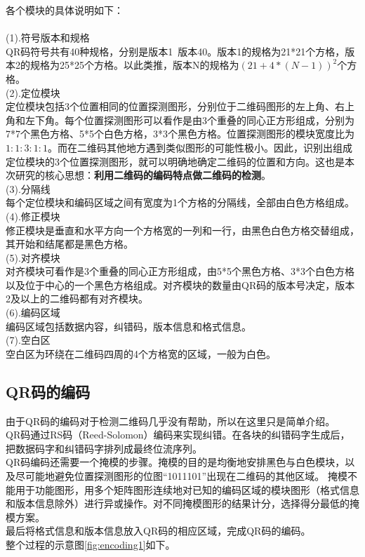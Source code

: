 各个模块的具体说明如下：\\ \\
(1).符号版本和规格\\
QR码符号共有40种规格，分别是版本1~版本40。版本1的规格为21*21个方格，版本2的规格为25*25个方格。以此类推，版本N的规格为$ (21+4*(N-1))^2 $个方格。\\
(2).定位模块\\
定位模块包括3个位置相同的位置探测图形，分别位于二维码图形的左上角、右上角和左下角。每个位置探测图形可以看作是由3个重叠的同心正方形组成，分别为7*7个黑色方格、5*5个白色方格，3*3个黑色方格。位置探测图形的模块宽度比为$ 1:1:3:1:1 $。而在二维码其他地方遇到类似图形的可能性极小。因此，识别出组成定位模块的3个位置探测图形，就可以明确地确定二维码的位置和方向。这也是本次研究的核心思想：\textbf{利用二维码的编码特点做二维码的检测}。\\
(3).分隔线\\
每个定位模块和编码区域之间有宽度为1个方格的分隔线，全部由白色方格组成。\\
(4).修正模块\\
修正模块是垂直和水平方向一个方格宽的一列和一行，由黑色白色方格交替组成，其开始和结尾都是黑色方格。\\
(5).对齐模块\\
对齐模块可看作是3个重叠的同心正方形组成，由5*5个黑色方格、3*3个白色方格以及位于中心的一个黑色方格组成。对齐模块的数量由QR码的版本号决定，版本2及以上的二维码都有对齐模块。\\
(6).编码区域\\
编码区域包括数据内容，纠错码，版本信息和格式信息。\\
(7).空白区\\
空白区为环绕在二维码四周的4个方格宽的区域，一般为白色。

\subsection{QR码的编码}
由于QR码的编码对于检测二维码几乎没有帮助，所以在这里只是简单介绍。\\
QR码通过RS码（Reed-Solomon）编码来实现纠错。在各块的纠错码字生成后，把数据码字和纠错码字排列成最终位流序列。\\
QR码编码还需要一个掩模的步骤。掩模的目的是均衡地安排黑色与白色模块，以及尽可能地避免位置探测图形的位图“1011101”出现在二维码的其他区域。
掩模不能用于功能图形，用多个矩阵图形连续地对已知的编码区域的模块图形（格式信息和版本信息除外）进行异或操作。对不同掩模图形的结果计分，选择得分最低的掩模方案。\\
最后将格式信息和版本信息放入QR码的相应区域，完成QR码的编码。\\
整个过程的示意图\ref{fig:encoding1}如下。

